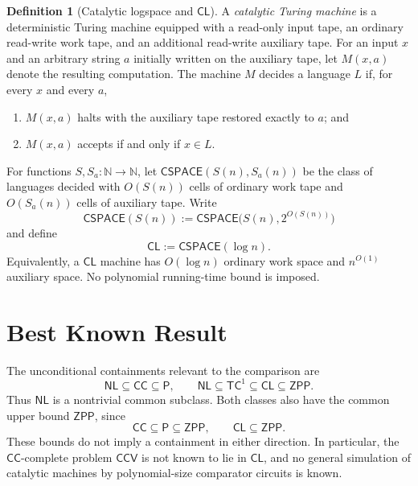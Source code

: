 \documentclass[10pt,a4paper]{article}
\theoremstyle{definition}
\newtheorem*{definition*}{Definition}
\newcommand{\CC}{\mathsf{CC}}
\newcommand{\CL}{\mathsf{CL}}
\newcommand{\NL}{\mathsf{NL}}
\newcommand{\TC}{\mathsf{TC}}
\newcommand{\Pclass}{\mathsf{P}}
\newcommand{\ZPP}{\mathsf{ZPP}}
\newcommand{\CSPACE}{\mathsf{CSPACE}}
\begin{document}
\begin{definition*}[Catalytic logspace and $\CL$]
A \emph{catalytic Turing machine} is a deterministic Turing machine equipped
with a read-only input tape, an ordinary read-write work tape, and an
additional read-write auxiliary tape. For an input $x$ and an arbitrary
string $a$ initially written on the auxiliary tape, let $M(x,a)$ denote the
resulting computation. The machine $M$ decides a language $L$ if, for every
$x$ and every $a$,
\begin{enumerate}
  \item $M(x,a)$ halts with the auxiliary tape restored exactly to $a$; and
  \item $M(x,a)$ accepts if and only if $x\in L$.
\end{enumerate}

For functions $S,S_a:\mathbb N\to\mathbb N$, let
$\CSPACE(S(n),S_a(n))$ be the class of languages decided with $O(S(n))$ cells
of ordinary work tape and $O(S_a(n))$ cells of auxiliary tape. Write
\begin{equation}
  \CSPACE(S(n))
  :=
  \CSPACE\bigl(S(n),2^{O(S(n))}\bigr)
\end{equation}
and define
\begin{equation}
  \CL:=\CSPACE(\log n).
\end{equation}
Equivalently, a $\CL$ machine has $O(\log n)$ ordinary work space and
$n^{O(1)}$ auxiliary space. No polynomial running-time bound is imposed.
\end{definition*}

\section{Best Known Result}

The unconditional containments relevant to the comparison are
\begin{equation}
  \NL\subseteq\CC\subseteq\Pclass,
  \qquad
  \NL\subseteq\TC^1\subseteq\CL\subseteq\ZPP.
\end{equation}
Thus $\NL$ is a nontrivial common subclass. Both classes also have the common
upper bound $\ZPP$, since
\begin{equation}
  \CC\subseteq\Pclass\subseteq\ZPP,
  \qquad
  \CL\subseteq\ZPP.
\end{equation}
These bounds do not imply a containment in either direction. In particular,
the $\CC$-complete problem $\mathsf{CCV}$ is not known to lie in $\CL$, and no
general simulation of catalytic machines by polynomial-size comparator
circuits is known.
\end{document}
